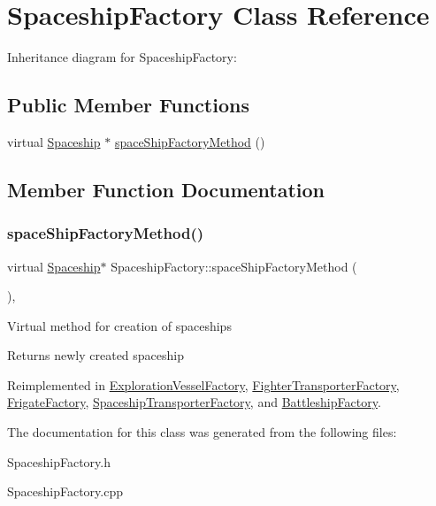\hypertarget{classSpaceshipFactory}{}\section{Spaceship\+Factory Class Reference}
\label{classSpaceshipFactory}


Inheritance diagram for Spaceship\+Factory\+:
\subsection*{Public Member Functions}
\begin{DoxyCompactItemize}
\item 
virtual \hyperlink{classSpaceship}{Spaceship} $\ast$ \hyperlink{classSpaceshipFactory_a146f5e82385a55e9bf4ce63e28f99a9d}{space\+Ship\+Factory\+Method} ()
\end{DoxyCompactItemize}


\subsection{Member Function Documentation}
\mbox{\label{classSpaceshipFactory_a146f5e82385a55e9bf4ce63e28f99a9d}} 
\subsubsection{\texorpdfstring{space\+Ship\+Factory\+Method()}{spaceShipFactoryMethod()}}
{\footnotesize\ttfamily virtual \hyperlink{classSpaceship}{Spaceship}$\ast$ Spaceship\+Factory\+::space\+Ship\+Factory\+Method (\begin{DoxyParamCaption}{ }\end{DoxyParamCaption})\hspace{0.3cm}{\ttfamily [inline]}, {\ttfamily [virtual]}}

Virtual method for creation of spaceships \begin{DoxyReturn}{Returns}
newly created spaceship 
\end{DoxyReturn}


Reimplemented in \hyperlink{classExplorationVesselFactory_a3a139abf87097903138688d662700a65}{Exploration\+Vessel\+Factory}, \hyperlink{classFighterTransporterFactory_a599f35f61d2ccd5d6eb44d97540660f9}{Fighter\+Transporter\+Factory}, \hyperlink{classFrigateFactory_adfe55ec4fd28b09ab5f0bba3e782c87d}{Frigate\+Factory}, \hyperlink{classSpaceshipTransporterFactory_a284f810807dd8ba597ed110b2c72f084}{Spaceship\+Transporter\+Factory}, and \hyperlink{classBattleshipFactory_a247e5af33c513bc110dbc73e84aa2bb1}{Battleship\+Factory}.



The documentation for this class was generated from the following files\+:\begin{DoxyCompactItemize}
\item 
Spaceship\+Factory.\+h\item 
Spaceship\+Factory.\+cpp\end{DoxyCompactItemize}
